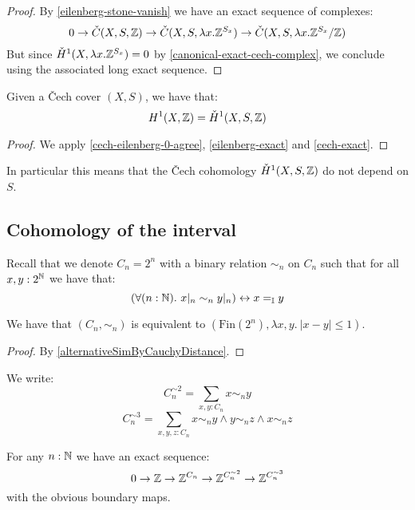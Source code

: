 \begin{proof}
By \cref{eilenberg-stone-vanish} we have an exact sequence of complexes:
\[0 \to \check{C}(X,S,\mathbb{Z}) \to \check{C}(X,S,\lambda x.\mathbb{Z}^{S_x}) \to \check{C}(X,S,\lambda x.\mathbb{Z}^{S_x}/\mathbb{Z})\]
But since $\check{H}^1(X,\lambda x.\mathbb{Z}^{S_x}) = 0$ by \cref{canonical-exact-cech-complex}, we conclude using the associated long exact sequence.
\end{proof}

\begin{theorem}\label{cech-eilenberg-1-agree}
Given a \v{C}ech cover $(X,S)$, we have that:
\[H^1(X,\mathbb{Z}) = \check{H}^1(X,S,\mathbb{Z})\]
\end{theorem}

\begin{proof}
We apply \cref{cech-eilenberg-0-agree}, \cref{eilenberg-exact} and \cref{cech-exact}.
\end{proof}

In particular this means that the \v{C}ech cohomology $\check{H}^1(X,S,\mathbb{Z})$ do not depend on $S$.


\subsection{Cohomology of the interval}

Recall that we denote $C_n=2^n$ with a binary relation $\sim_n$ on $C_n$ such that for all $x,y:2^{\mathbb{N}}$ we have that:
\[\left(\forall(n:\mathbb{N}).\ x|_n\sim_n y|_n\right) \leftrightarrow x=_\mathbb{I}y\]

\begin{lemma}\label{description-Cn-simn}
We have that $(C_n,\sim_n)$ is equivalent to $(\mathrm{Fin}(2^n),\lambda x,y.\ |x-y|\leq 1)$.
\end{lemma}

\begin{proof}
By \cref{alternativeSimByCauchyDistance}.
\end{proof}

We write:
\[C_n^{\sim2} = \sum_{x,y:C_n}x\sim_n y\]
\[C_n^{\sim3}  =  \sum_{x,y,z:C_n}x\sim_n y \land y\sim_n z\land x\sim_n z\]

\begin{lemma}\label{Cn-exact-sequence}
For any $n:\mathbb{N}$ we have an exact sequence:
\[0\to \mathbb{Z}\to \mathbb{Z}^{C_n} \to \mathbb{Z}^{C_n^{\sim2}} \to \mathbb{Z}^{C_n^{\sim3}}\]
with the obvious boundary maps.
\end{lemma}


